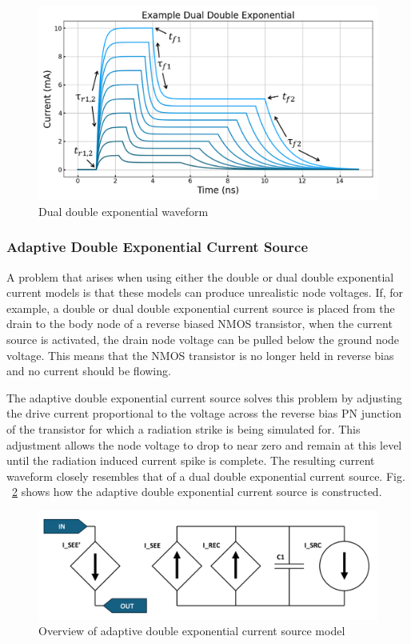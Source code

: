 \documentclass[conference]{IEEEtran}
\begin{document}
    \begin{figure}[htbp]
        \centering
        \includegraphics[width=0.95\linewidth]{dual_double_exp_param}
        \caption{Dual double exponential waveform}
        \label{fig:dual_double_exp}
    \end{figure}

    \subsubsection{Adaptive Double Exponential Current Source}
    A problem that arises when using either the double or dual double exponential current models is that these models can produce unrealistic node voltages.
    If, for example, a double or dual double exponential current source is placed from the drain to the body node of a reverse biased NMOS transistor, when the current source is activated, the drain node voltage can be pulled below the ground node voltage.
    This means that the NMOS transistor is no longer held in reverse bias and no current should be flowing.

    The adaptive double exponential current source solves this problem by adjusting the drive current proportional to the voltage across the reverse bias PN junction of the transistor for which a radiation strike is being simulated for.
    This adjustment allows the node voltage to drop to near zero and remain at this level until the radiation induced current spike is complete.
    The resulting current waveform closely resembles that of a dual double exponential current source. Fig. ~\ref{fig:adaptive_model_overview} shows how the adaptive double exponential current source is constructed.

    \begin{figure}[htbp]
        \centering
        \includegraphics[width=0.95\linewidth]{Adaptive_Model_Cropped}
        \caption{Overview of adaptive double exponential current source model \cite{Kauppila2009}}
        \label{fig:adaptive_model_overview}
    \end{figure}
\end{document}

